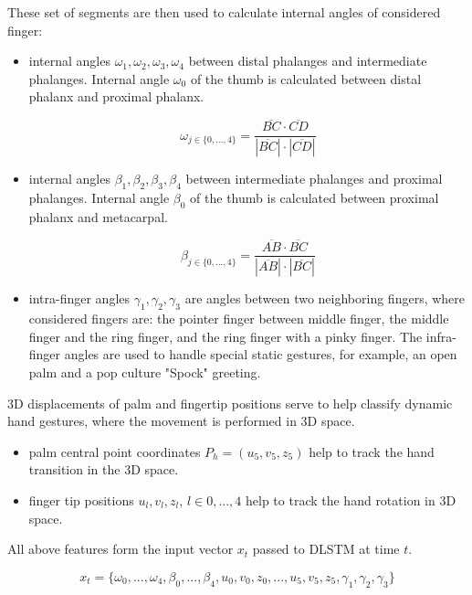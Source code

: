 These set of segments are then used to calculate internal angles of considered finger:
\begin{itemize}
    \item internal angles $\omega_1, \omega_2, \omega_3, \omega_4$ between distal phalanges and intermediate phalanges. Internal angle $\omega_0$ of the thumb is calculated between distal phalanx and proximal phalanx.
	
	\begin{equation}
		{\omega_{j \in \{0, ..., 4\}} = \frac{\overline{BC} \cdot \overline{CD}}{|\overline{BC}| \cdot |\overline{CD}|}}
	\end{equation}

    \item internal angles $\beta_1, \beta_2, \beta_3, \beta_4$ between intermediate phalanges and proximal phalanges. Internal angle $\beta_0$ of the thumb is calculated between proximal phalanx and metacarpal.
	
	\begin{equation}
		{\beta_{j \in \{0, ..., 4\}} = \frac{\overline{AB} \cdot \overline{BC}}{|\overline{AB}| \cdot |\overline{BC}|}}
	\end{equation}
	
    \item intra-finger angles $\gamma_1, \gamma_2, \gamma_3$ are angles between two neighboring fingers, where considered fingers are: the pointer finger between middle finger, the middle finger and the ring finger, and the ring finger with a pinky finger. The infra-finger angles are used to handle special static gestures,  for example, an open palm and a pop culture "Spock" greeting.
\end{itemize}


3D displacements of palm and fingertip positions serve to help classify dynamic hand gestures, where the movement is performed in 3D space.


\begin{itemize}
	\item palm central point coordinates $P_h = (u_5, v_5, z_5)$ help to track the hand transition in the 3D space.
	\item finger tip positions $u_l, v_l, z_l$, $l \in {0, ..., 4}$ help to track the hand rotation in 3D space.
\end{itemize}

All above features form the input vector $x_t$ passed to DLSTM at time $t$.

\begin{equation}
	{x_t = \{\omega_0, ...,\omega_4, \beta_0, ..., \beta_4, u_0,v_0,z_0, ..., u_5,v_5,z_5, \gamma_1, \gamma_2, \gamma_3\}}
\end{equation}

